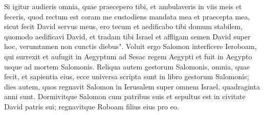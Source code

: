 \begin{biblechapter}
\verse Si igitur audieris omnia, quae praecepero tibi, et ambulaveris in viis meis et feceris, quod rectum est coram me custodiens mandata mea et praecepta mea, sicut fecit David servus meus, ero tecum et aedificabo tibi domum stabilem, quomodo aedificavi David, et tradam tibi Israel 
\verse et affligam semen David super hoc, verumtamen non cunctis diebus". 
\verse Voluit ergo Salomon interficere Ieroboam, qui surrexit et aufugit in Aegyptum ad Sesac regem Aegypti et fuit in Aegypto usque ad mortem Salomonis. 
\verse Reliqua autem gestorum Salomonis, omnia, quae fecit, et sapientia eius, ecce universa scripta sunt in libro gestorum Salomonis; 
\verse dies autem, quos regnavit Salomon in Ierusalem super omnem Israel, quadraginta anni sunt. 
\verse Dormivitque Salomon cum patribus suis et sepultus est in civitate David patris sui; regnavitque Roboam filius eius pro eo. 
\end{biblechapter}

